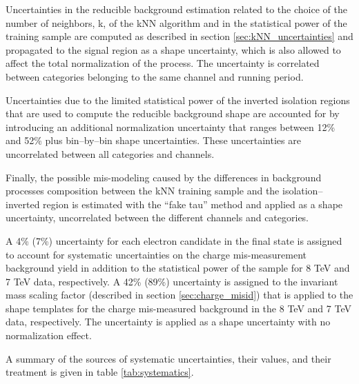 Uncertainties in the reducible background estimation related to the choice of the number of neighbors, k, of the kNN algorithm and in the statistical power of the training sample are computed as described in section \ref{sec:kNN_uncertainties} and propagated to the signal region as a shape uncertainty, which is also allowed to affect the total normalization of the process. The uncertainty is correlated between categories belonging to the same channel and running period.

Uncertainties due to the limited statistical power of the inverted isolation regions that are used to compute the reducible background shape are accounted for by introducing an additional normalization uncertainty that ranges between 12\% and 52\% plus bin--by--bin shape uncertainties. These uncertainties are uncorrelated between all categories and channels.

Finally, the possible mis-modeling caused by the differences in background processes composition between the kNN training sample and the isolation--inverted region is estimated with the ``fake tau'' method and applied as a shape uncertainty, uncorrelated between the different channels and categories.

A 4\% (7\%) uncertainty for each electron candidate in the final state is assigned to account for systematic uncertainties on the charge mis-measurement background yield in addition to the statistical power of the sample for 8 TeV and 7 TeV data, respectively. A 42\% (89\%) uncertainty is assigned to the invariant mass scaling factor (described in section \ref{sec:charge_misid}) that is applied to the shape templates for the charge mis-measured background in the 8 TeV and 7 TeV data, respectively. The uncertainty is applied as a shape uncertainty with no normalization effect. %

A summary of the sources of systematic uncertainties, their values, and their treatment is given in table \ref{tab:systematics}.

